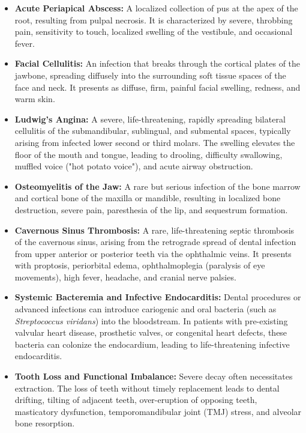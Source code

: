 \begin{itemize}
    \item \textbf{Acute Periapical Abscess:} A localized collection of pus at the apex of the root, resulting from pulpal necrosis. It is characterized by severe, throbbing pain, sensitivity to touch, localized swelling of the vestibule, and occasional fever.
    \item \textbf{Facial Cellulitis:} An infection that breaks through the cortical plates of the jawbone, spreading diffusely into the surrounding soft tissue spaces of the face and neck. It presents as diffuse, firm, painful facial swelling, redness, and warm skin.
    \item \textbf{Ludwig's Angina:} A severe, life-threatening, rapidly spreading bilateral cellulitis of the submandibular, sublingual, and submental spaces, typically arising from infected lower second or third molars. The swelling elevates the floor of the mouth and tongue, leading to drooling, difficulty swallowing, muffled voice ("hot potato voice"), and acute airway obstruction.
    \item \textbf{Osteomyelitis of the Jaw:} A rare but serious infection of the bone marrow and cortical bone of the maxilla or mandible, resulting in localized bone destruction, severe pain, paresthesia of the lip, and sequestrum formation.
    \item \textbf{Cavernous Sinus Thrombosis:} A rare, life-threatening septic thrombosis of the cavernous sinus, arising from the retrograde spread of dental infection from upper anterior or posterior teeth via the ophthalmic veins. It presents with proptosis, periorbital edema, ophthalmoplegia (paralysis of eye movements), high fever, headache, and cranial nerve palsies.
    \item \textbf{Systemic Bacteremia and Infective Endocarditis:} Dental procedures or advanced infections can introduce cariogenic and oral bacteria (such as \textit{Streptococcus viridans}) into the bloodstream. In patients with pre-existing valvular heart disease, prosthetic valves, or congenital heart defects, these bacteria can colonize the endocardium, leading to life-threatening infective endocarditis.
    \item \textbf{Tooth Loss and Functional Imbalance:} Severe decay often necessitates extraction. The loss of teeth without timely replacement leads to dental drifting, tilting of adjacent teeth, over-eruption of opposing teeth, masticatory dysfunction, temporomandibular joint (TMJ) stress, and alveolar bone resorption.
\end{itemize}

